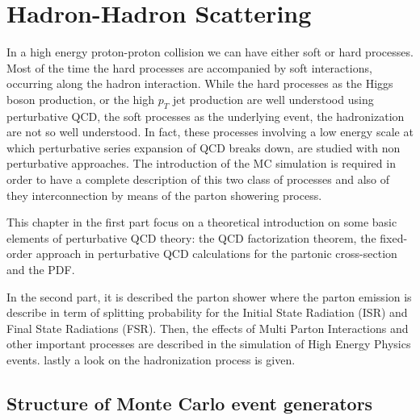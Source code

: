 %
%
%

%


\chapter{Hadron-Hadron Scattering}
\label{chap:Hadron-HadronScattering}





In a high energy proton-proton collision we can have either soft or hard processes.
Most of the time the hard processes are accompanied by soft interactions, occurring along the hadron interaction.
While the hard processes as the Higgs boson production, or the high $p_T$ jet production are well understood using perturbative QCD, the soft processes as the underlying event, the hadronization are not so well understood. In fact, these processes involving a low energy scale at which perturbative series expansion of QCD breaks down, are studied with non perturbative approaches. The introduction of the MC simulation is required in order to have a complete description of this two class of processes and also of they interconnection by means of the parton showering process. 

This chapter in the first part focus on a theoretical introduction on some basic elements of perturbative QCD theory: the QCD factorization theorem, the fixed-order approach in perturbative QCD calculations for the partonic cross-section and the PDF.  

\noindent In the second part, it is described the parton shower where the parton emission is describe in term of splitting probability for the Initial State Radiation (ISR) and Final State Radiations (FSR). Then, the effects of Multi Parton Interactions and other important processes are described in the simulation of High Energy Physics events. lastly a look on the hadronization process is given.

\section{Structure of Monte Carlo event generators}


